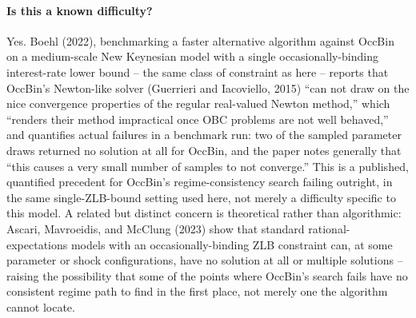 \documentclass[11pt]{article}
\begin{document}
\paragraph{Is this a known difficulty?} Yes. Boehl (2022), benchmarking a
faster alternative algorithm against OccBin on a medium-scale New
Keynesian model with a single occasionally-binding interest-rate lower
bound -- the same class of constraint as here -- reports that OccBin's
Newton-like solver (Guerrieri and Iacoviello, 2015) ``can not draw on the
nice convergence properties of the regular real-valued Newton method,''
which ``renders their method impractical once OBC problems are not well
behaved,'' and quantifies actual failures in a benchmark run: two of the
sampled parameter draws returned no solution at all for OccBin, and the
paper notes generally that ``this causes a very small number of samples
to not converge.'' This is a published, quantified precedent for OccBin's
regime-consistency search failing outright, in the same single-ZLB-bound
setting used here, not merely a difficulty specific to this model. A
related but distinct concern is theoretical rather than algorithmic:
Ascari, Mavroeidis, and McClung (2023) show that standard
rational-expectations models with an occasionally-binding ZLB constraint
can, at some parameter or shock configurations, have no solution at all
or multiple solutions -- raising the possibility that some of the points
where OccBin's search fails have no consistent regime path to find in the
first place, not merely one the algorithm cannot locate.
\end{document}

